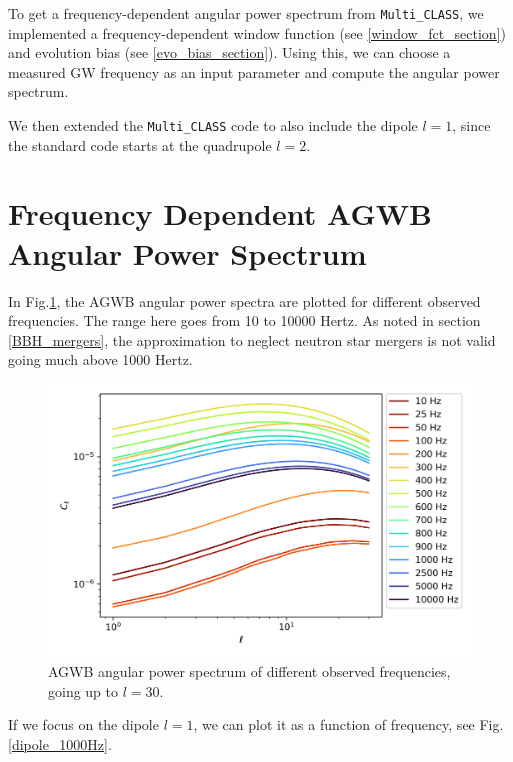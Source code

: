 To get a frequency-dependent angular power spectrum from {\tt Multi\_CLASS}, we implemented a frequency-dependent window function (see \ref{window_fct_section}) and evolution bias (see \ref{evo_bias_section}). Using this, we can choose a measured GW frequency as an input parameter and compute the angular power spectrum. 

We then extended the {\tt Multi\_CLASS} code to also include the dipole $l=1$, since the standard code starts at the quadrupole $l=2$.

\section{Frequency Dependent AGWB Angular Power Spectrum}

In Fig.\ref{AGWB_anisotropies}, the AGWB angular power spectra are plotted for different observed frequencies. The range here goes from 10 to 10000 Hertz. As noted in section \ref{BBH_mergers}, the approximation to neglect neutron star mergers is not valid going much above 1000 Hertz.

\begin{figure}
    \centering
    \includegraphics[width=1\linewidth]{Images/C_l_frequencies.png}
    \caption{AGWB angular power spectrum of different observed frequencies, going up to $l=30$.}
    \label{AGWB_anisotropies}
\end{figure} 

If we focus on the dipole $l=1$, we can plot it as a function of frequency, see Fig.\ref{dipole_1000Hz}.

